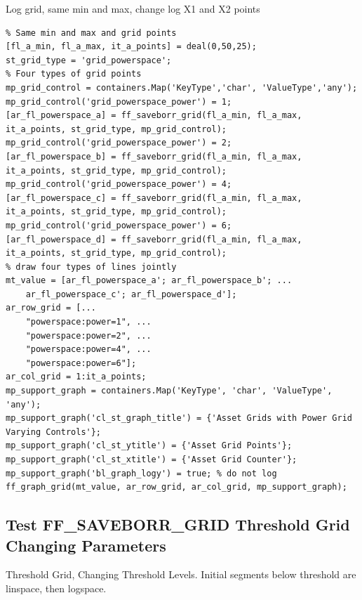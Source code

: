 \documentclass[
]{book}
\begin{document}
Log grid, same min and max, change log X1 and X2 points

\begin{verbatim}
% Same min and max and grid points
[fl_a_min, fl_a_max, it_a_points] = deal(0,50,25);
st_grid_type = 'grid_powerspace';
% Four types of grid points
mp_grid_control = containers.Map('KeyType','char', 'ValueType','any');
mp_grid_control('grid_powerspace_power') = 1;
[ar_fl_powerspace_a] = ff_saveborr_grid(fl_a_min, fl_a_max, it_a_points, st_grid_type, mp_grid_control);
mp_grid_control('grid_powerspace_power') = 2;
[ar_fl_powerspace_b] = ff_saveborr_grid(fl_a_min, fl_a_max, it_a_points, st_grid_type, mp_grid_control);
mp_grid_control('grid_powerspace_power') = 4;
[ar_fl_powerspace_c] = ff_saveborr_grid(fl_a_min, fl_a_max, it_a_points, st_grid_type, mp_grid_control);
mp_grid_control('grid_powerspace_power') = 6;
[ar_fl_powerspace_d] = ff_saveborr_grid(fl_a_min, fl_a_max, it_a_points, st_grid_type, mp_grid_control);
% draw four types of lines jointly
mt_value = [ar_fl_powerspace_a'; ar_fl_powerspace_b'; ...
    ar_fl_powerspace_c'; ar_fl_powerspace_d'];
ar_row_grid = [...
    "powerspace:power=1", ...
    "powerspace:power=2", ...
    "powerspace:power=4", ...
    "powerspace:power=6"];
ar_col_grid = 1:it_a_points;
mp_support_graph = containers.Map('KeyType', 'char', 'ValueType', 'any');
mp_support_graph('cl_st_graph_title') = {'Asset Grids with Power Grid Varying Controls'};
mp_support_graph('cl_st_ytitle') = {'Asset Grid Points'};
mp_support_graph('cl_st_xtitle') = {'Asset Grid Counter'};
mp_support_graph('bl_graph_logy') = true; % do not log
ff_graph_grid(mt_value, ar_row_grid, ar_col_grid, mp_support_graph);
\end{verbatim}

\hypertarget{test-ff_saveborr_grid-threshold-grid-changing-parameters}{%
\subsection{Test FF\_SAVEBORR\_GRID Threshold Grid Changing Parameters}\label{test-ff_saveborr_grid-threshold-grid-changing-parameters}}

Threshold Grid, Changing Threshold Levels. Initial segments below
threshold are linspace, then logspace.
\end{document}
